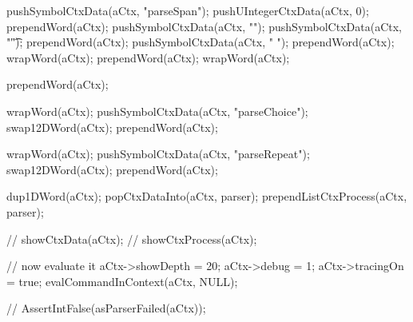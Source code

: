   pushSymbolCtxData(aCtx, "parseSpan");
  pushUIntegerCtxData(aCtx, 0);
  prependWord(aCtx);
  pushSymbolCtxData(aCtx, "\n");
  pushSymbolCtxData(aCtx, "\t");
  prependWord(aCtx);
  pushSymbolCtxData(aCtx, " ");
  prependWord(aCtx);
  wrapWord(aCtx);
  prependWord(aCtx);
  wrapWord(aCtx);
  
  prependWord(aCtx);
  
  wrapWord(aCtx);
  pushSymbolCtxData(aCtx, "parseChoice");
  swap12DWord(aCtx);
  prependWord(aCtx);
  
  wrapWord(aCtx);
  pushSymbolCtxData(aCtx, "parseRepeat");
  swap12DWord(aCtx);
  prependWord(aCtx);
  
  dup1DWord(aCtx);
  popCtxDataInto(aCtx, parser);
  prependListCtxProcess(aCtx, parser);
  
//  showCtxData(aCtx);
//  showCtxProcess(aCtx);
  
  // now evaluate it
  aCtx->showDepth = 20;
  aCtx->debug     = 1;
  aCtx->tracingOn = true;
  evalCommandInContext(aCtx, NULL);
  
//  AssertIntFalse(asParserFailed(aCtx));
\stopCTest
\stopTestCase
\stopTestSuite